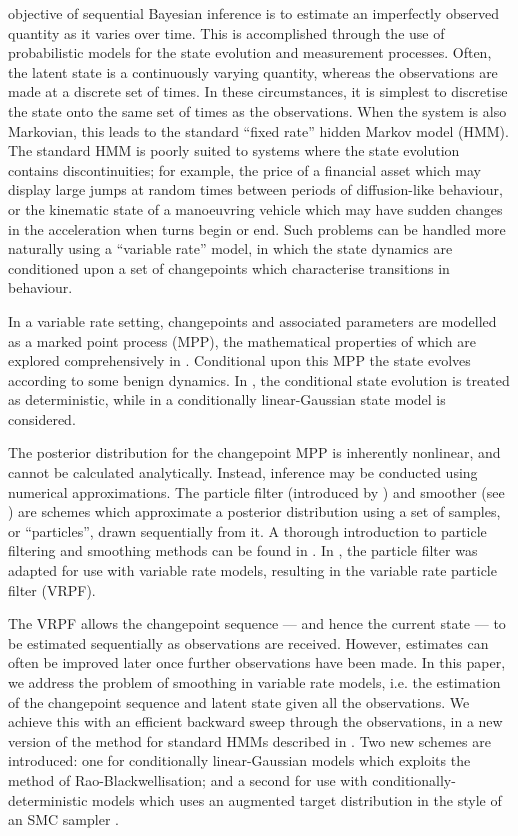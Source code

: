 \documentclass[10pt,twocolumn,twoside]{IEEEtran}
\begin{document}
 objective of sequential Bayesian inference is to estimate an imperfectly observed quantity as it varies over time. This is accomplished through the use of probabilistic models for the state evolution and measurement processes. Often, the latent state is a continuously varying quantity, whereas the observations are made at a discrete set of times. In these circumstances, it is simplest to discretise the state onto the same set of times as the observations. When the system is also Markovian, this leads to the standard ``fixed rate'' hidden Markov model (HMM). The standard HMM is poorly suited to systems where the state evolution contains discontinuities; for example, the price of a financial asset which may display large jumps at random times between periods of diffusion-like behaviour, or the kinematic state of a manoeuvring vehicle which may have sudden changes in the acceleration when turns begin or end. Such problems can be handled more naturally using a ``variable rate'' model, in which the state dynamics are conditioned upon a set of changepoints which characterise transitions in behaviour.

In a variable rate setting, changepoints and associated parameters are modelled as a marked point process (MPP), the mathematical properties of which are explored comprehensively in \cite{Jacobsen2006}. Conditional upon this MPP the state evolves according to some benign dynamics. In \cite{Godsill2007,Whiteley2011}, the conditional state evolution is treated as deterministic, while in \cite{Godsill2007a,Christensen2012} a conditionally linear-Gaussian state model is considered.

The posterior distribution for the changepoint MPP is inherently nonlinear, and cannot be calculated analytically. Instead, inference may be conducted using numerical approximations. The particle filter (introduced by \cite{Gordon1993}) and smoother (see \cite{Doucet2000a,Godsill2004}) are schemes which approximate a posterior distribution using a set of samples, or ``particles'', drawn sequentially from it.  A thorough introduction to particle filtering and smoothing methods can be found in \cite{Cappe2007,Doucet2009}. In \cite{Godsill2007a,Godsill2007,Whiteley2011}, the particle filter was adapted for use with variable rate models, resulting in the variable rate particle filter (VRPF).

The VRPF allows the changepoint sequence --- and hence the current state --- to be estimated sequentially as observations are received. However, estimates can often be improved later once further observations have been made. In this paper, we address the problem of smoothing in variable rate models, i.e. the estimation of the changepoint sequence and latent state given all the observations. We achieve this with an efficient backward sweep through the observations, in a new version of the method for standard HMMs described in \cite{Godsill2004}. Two new schemes are introduced: one for conditionally linear-Gaussian models which exploits the method of Rao-Blackwellisation; and a second for use with conditionally-deterministic models which uses an augmented target distribution in the style of an SMC sampler \cite{DelMoral2006}.
\end{document}
